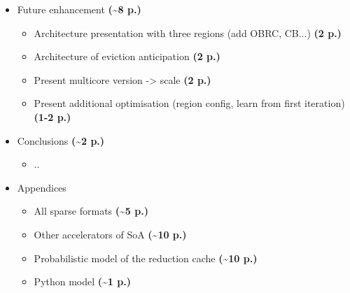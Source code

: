 \begin{itemize}
    \begin{itemize}
        \item Experimentations: RTL simulation results -> matrices chosen, generated / metrics / ...
        \item Results / comparison with theory / analysis / conclusion
    \end{itemize}
    \item Future enhancement \textbf{(\textasciitilde 8 p.)}
    \begin{itemize}
        \item Architecture presentation with three regions (add OBRC, CB...) \textbf{(2 p.)}
        \item Architecture of eviction anticipation \textbf{(2 p.)}
        \item Present multicore version -> scale \textbf{(2 p.)}
        \item Present additional optimisation (region config, learn from first iteration) \textbf{(1-2 p.)}
    \end{itemize}
    \item Conclusions \textbf{(\textasciitilde 2 p.)}
    \begin{itemize}
        \item ..
    \end{itemize}
    \item Appendices
    \begin{itemize}
        \item All sparse formats \textbf{(\textasciitilde 5 p.)}
        \item Other accelerators of SoA \textbf{(\textasciitilde 10 p.)}
        \item Probabilistic model of the reduction cache \textbf{(\textasciitilde 10 p.)}
        \item Python model \textbf{(\textasciitilde 1 p.)}
    \end{itemize}
\end{itemize}